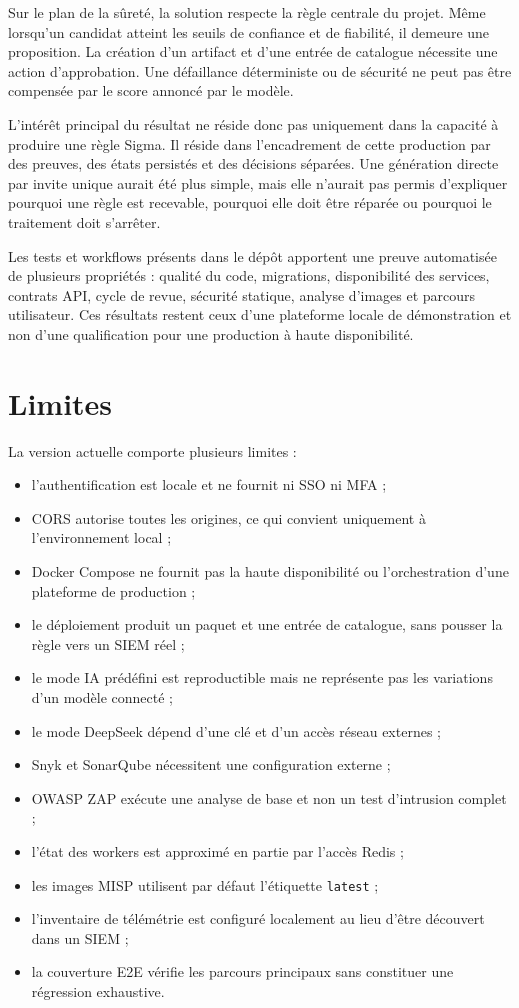 Sur le plan de la sûreté, la solution respecte la règle centrale du projet. Même lorsqu'un candidat atteint les seuils de confiance et de fiabilité, il demeure une proposition. La création d'un artifact et d'une entrée de catalogue nécessite une action d'approbation. Une défaillance déterministe ou de sécurité ne peut pas être compensée par le score annoncé par le modèle.

L'intérêt principal du résultat ne réside donc pas uniquement dans la capacité à produire une règle Sigma. Il réside dans l'encadrement de cette production par des preuves, des états persistés et des décisions séparées. Une génération directe par invite unique aurait été plus simple, mais elle n'aurait pas permis d'expliquer pourquoi une règle est recevable, pourquoi elle doit être réparée ou pourquoi le traitement doit s'arrêter.

Les tests et workflows présents dans le dépôt apportent une preuve automatisée de plusieurs propriétés : qualité du code, migrations, disponibilité des services, contrats API, cycle de revue, sécurité statique, analyse d'images et parcours utilisateur. Ces résultats restent ceux d'une plateforme locale de démonstration et non d'une qualification pour une production à haute disponibilité.

\section{Limites}

La version actuelle comporte plusieurs limites :
\begin{itemize}[leftmargin=1.2cm]
    \item l'authentification est locale et ne fournit ni SSO ni MFA ;
    \item CORS autorise toutes les origines, ce qui convient uniquement à l'environnement local ;
    \item Docker Compose ne fournit pas la haute disponibilité ou l'orchestration d'une plateforme de production ;
    \item le déploiement produit un paquet et une entrée de catalogue, sans pousser la règle vers un SIEM réel ;
    \item le mode IA prédéfini est reproductible mais ne représente pas les variations d'un modèle connecté ;
    \item le mode DeepSeek dépend d'une clé et d'un accès réseau externes ;
    \item Snyk et SonarQube nécessitent une configuration externe ;
    \item OWASP ZAP exécute une analyse de base et non un test d'intrusion complet ;
    \item l'état des workers est approximé en partie par l'accès Redis ;
    \item les images MISP utilisent par défaut l'étiquette \texttt{latest} ;
    \item l'inventaire de télémétrie est configuré localement au lieu d'être découvert dans un SIEM ;
    \item la couverture E2E vérifie les parcours principaux sans constituer une régression exhaustive.
\end{itemize}

